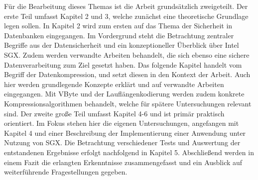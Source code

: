 Für die Bearbeitung dieses Themas ist die Arbeit grundsätzlich zweigeteilt. Der erste Teil umfasst Kapitel 2 und 3, welche zunächst eine theoretische Grundlage legen sollen. In Kapitel 2 wird zum ersten auf das Thema der Sicherheit in Datenbanken eingegangen. Im Vordergrund steht die Betrachtung zentraler Begriffe aus der Datensicherheit und ein konzeptioneller Überblick über Intel \ac{SGX}. Zudem werden verwandte Arbeiten behandelt, die sich ebenso eine sichere Datenverarbeitung zum Ziel gesetzt haben. Das folgende Kapitel handelt vom Begriff der Datenkompression, und setzt diesen in den Kontext der Arbeit. Auch hier werden grundlegende Konzepte erklärt und auf verwandte Arbeiten eingegangen. Mit VByte und der Lauflängenkodierung werden zudem konkrete Kompressionsalgorithmen behandelt, welche für spätere Untersuchungen relevant sind. Der zweite große Teil umfasst Kapitel 4-6 und ist primär praktisch orientiert. Im Fokus stehen hier die eigenen Untersuchungen, angefangen mit Kapitel 4 und einer Beschreibung der Implementierung einer Anwendung unter Nutzung von \ac{SGX}. Die Betrachtung verschiedener Tests und Auswertung der entstandenen Ergebnisse erfolgt nachfolgend in Kapitel 5. Abschließend werden in einem Fazit die erlangten Erkenntnisse zusammengefasst und ein Ausblick auf weiterführende Fragestellungen gegeben.